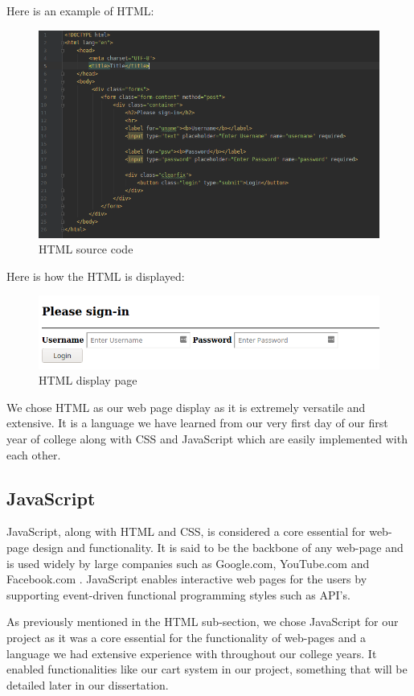Here is an example of HTML:
\begin{figure}[h]
    \centering
    \includegraphics[scale=0.4]{img/htmlinput.png}
    \caption{HTML source code}
    \label{fig:my_label}
\end{figure}

Here is how the HTML is displayed:
\begin{figure}[h]
    \centering
    \includegraphics[scale=0.4]{img/htmloutput.png}
    \caption{HTML display page}
    \label{fig:my_label}
\end{figure}


We chose HTML as our web page display as it is extremely versatile and extensive. It is a language we have learned from our very first day of our first year of college along with CSS and JavaScript which are easily implemented with each other.
\newpage
\subsection{JavaScript}
JavaScript, along with HTML and CSS, is considered a core essential for web-page design and functionality. It is said to be the backbone of any web-page and is used widely by large companies such as Google.com, YouTube.com and Facebook.com \cite{w3techs}. JavaScript enables interactive web pages for the users by supporting event-driven functional programming styles such as API's.

As previously mentioned in the HTML sub-section, we chose JavaScript for our project as it was a core essential for the functionality of web-pages and a language we had extensive experience with throughout our college years. It enabled functionalities like our cart system in our project, something that will be detailed later in our dissertation.

